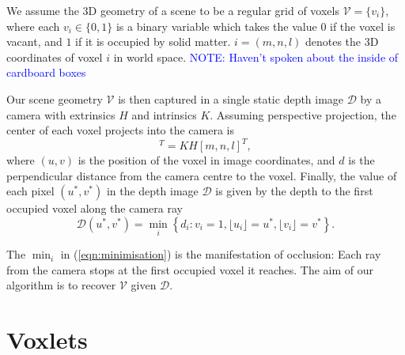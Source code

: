 \documentclass[10pt,twocolumn,letterpaper]{article}
\newcommand{\rgbdimage}{\mathcal{D}}
\newcommand{\intrinsics}{K}
\newcommand{\voxelgrid}{\mathcal{V}}
\newcommand{\voxel}{v}
\newcommand{\voxidx}{i}
\newcommand{\voxelidxs}{m, n, l}
\newcommand{\trans}{T}
\newcommand{\extrinsics}{H}
\newcommand{\voxelgridtoworld}{\trans_{\voxelgrid \rightarrow w}}
\newcommand{\note}[1]{\textcolor{blue}{NOTE: #1}}
\begin{document}
We assume the 3D geometry of a scene to be a regular grid of voxels $\voxelgrid = \{\voxel_\voxidx\}$, where each $\voxel_\voxidx \in \{0, 1\}$ is a binary variable which takes the value $0$ if the voxel is vacant, and $1$ if it is occupied by solid matter.
$\voxidx = (\voxelidxs)$ denotes the 3D coordinates of voxel $\voxidx$ in world space.
\note{Haven't spoken about the inside of cardboard boxes}

Our scene geometry $\voxelgrid$ is then captured in a single static depth image $\rgbdimage$ by a camera with extrinsics $\extrinsics$ and intrinsics $\intrinsics$. 
Assuming perspective projection, the center of each voxel projects into the camera is
\begin{equation}
[u, v, d]^T = \intrinsics \extrinsics [\voxelidxs]^T,
\end{equation}
where $(u,v)$ is the position of the voxel in image coordinates, and $d$ is the  perpendicular distance from the camera centre to the voxel.
Finally, the value of each pixel $(u^*, v^*)$ in the depth image $\rgbdimage$ is given by the depth to the first occupied voxel along the camera ray
\begin{equation}
\rgbdimage(u^*,v^*) = \min_\voxidx \left\{ d_{\voxidx} : v_{\voxidx} = 1, \lfloor u_{\voxidx} \rfloor = u^*, \lfloor v_{\voxidx} \rfloor = v^* \right\}.
\label{eqn:minimisation}
\end{equation}

The $\min_\voxidx$ in (\ref{eqn:minimisation}) is the manifestation of occlusion: Each ray from the camera stops at the first occupied voxel it reaches.
The aim of our algorithm is to recover $\voxelgrid$ given $\rgbdimage$.



\section{Voxlets}
\end{document}
